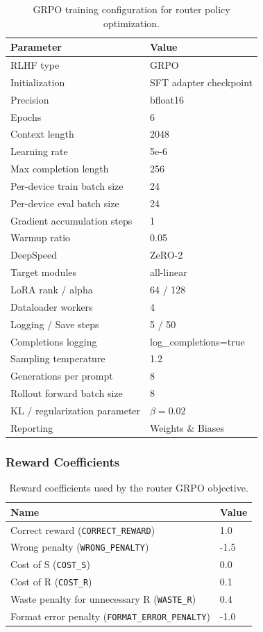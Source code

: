 \documentclass{article}
\theoremstyle{plain}
\theoremstyle{definition}
\theoremstyle{remark}
\begin{document}
\begin{table}[H]
\centering
\small
\begin{tabular}{ll}
\toprule
Parameter & Value \\
\midrule
RLHF type & GRPO \\
Initialization & SFT adapter checkpoint \\
Precision & bfloat16 \\
Epochs & 6 \\
Context length & 2048 \\
Learning rate & 5e-6 \\
Max completion length & 256 \\
Per-device train batch size & 24 \\
Per-device eval batch size & 24 \\
Gradient accumulation steps & 1 \\
Warmup ratio & 0.05 \\
DeepSpeed & ZeRO-2 \\
Target modules & all-linear \\
LoRA rank / alpha & 64 / 128 \\
Dataloader workers & 4 \\
Logging / Save steps & 5 / 50 \\
Completions logging & log\_completions=true \\
Sampling temperature & 1.2 \\
Generations per prompt & 8 \\
Rollout forward batch size & 8 \\
KL / regularization parameter & $\beta=0.02$ \\
Reporting & Weights \& Biases \\
\bottomrule
\end{tabular}
\caption{GRPO training configuration for router policy optimization.}
\end{table}

\subsubsection{Reward Coefficients}
\label{app:router_reward_coeffs}

\begin{table}[H]
\centering
\small
\begin{tabular}{ll}
\toprule
Name & Value \\
\midrule
Correct reward (\texttt{CORRECT\_REWARD}) & 1.0 \\
Wrong penalty (\texttt{WRONG\_PENALTY}) & -1.5 \\
Cost of S (\texttt{COST\_S}) & 0.0 \\
Cost of R (\texttt{COST\_R}) & 0.1 \\
Waste penalty for unnecessary R (\texttt{WASTE\_R}) & 0.4 \\
Format error penalty (\texttt{FORMAT\_ERROR\_PENALTY}) & -1.0 \\
\bottomrule
\end{tabular}
\caption{Reward coefficients used by the router GRPO objective.}
\end{table}
\end{document}
